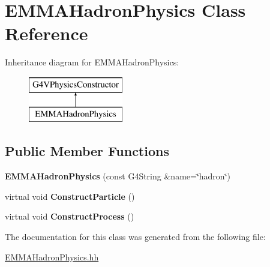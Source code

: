 \hypertarget{classEMMAHadronPhysics}{\section{E\-M\-M\-A\-Hadron\-Physics Class Reference}
\label{classEMMAHadronPhysics}
}
Inheritance diagram for E\-M\-M\-A\-Hadron\-Physics\-:\begin{figure}[H]
\begin{center}
\leavevmode
\includegraphics[height=2.000000cm]{classEMMAHadronPhysics}
\end{center}
\end{figure}
\subsection*{Public Member Functions}
\begin{DoxyCompactItemize}
\item 
\hypertarget{classEMMAHadronPhysics_a9a241e21fdb35f686233b0c12bef38c2}{{\bfseries E\-M\-M\-A\-Hadron\-Physics} (const G4\-String \&name=\char`\"{}hadron\char`\"{})}\label{classEMMAHadronPhysics_a9a241e21fdb35f686233b0c12bef38c2}

\item 
\hypertarget{classEMMAHadronPhysics_a342b85fe74e708967e40bf956e61b8b0}{virtual void {\bfseries Construct\-Particle} ()}\label{classEMMAHadronPhysics_a342b85fe74e708967e40bf956e61b8b0}

\item 
\hypertarget{classEMMAHadronPhysics_a5eb62a40e5b22f9fe574b7068389ab6e}{virtual void {\bfseries Construct\-Process} ()}\label{classEMMAHadronPhysics_a5eb62a40e5b22f9fe574b7068389ab6e}

\end{DoxyCompactItemize}


The documentation for this class was generated from the following file\-:\begin{DoxyCompactItemize}
\item 
\hyperlink{EMMAHadronPhysics_8hh}{E\-M\-M\-A\-Hadron\-Physics.\-hh}\end{DoxyCompactItemize}
